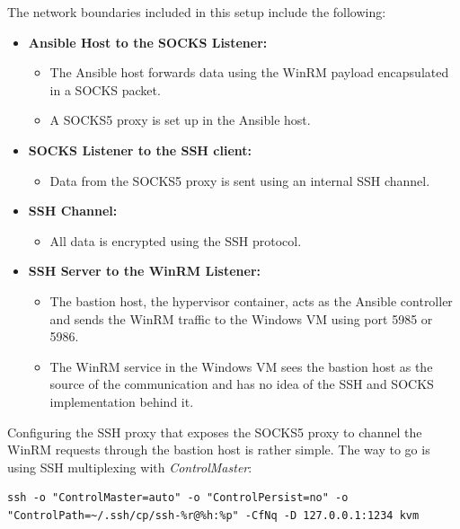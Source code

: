 The network boundaries included in this setup include the following:

\begin{itemize}
    \item \textbf{Ansible Host to the SOCKS Listener:}
        \begin{itemize}
            \item The Ansible host forwards data using the WinRM payload encapsulated in a SOCKS packet.
            \item A SOCKS5 proxy is set up in the Ansible host.
        \end{itemize}
    \item \textbf{SOCKS Listener to the SSH client:}
        \begin{itemize}
            \item Data from the SOCKS5 proxy is sent using an internal SSH channel.
        \end{itemize}
    \item \textbf{SSH Channel:}
        \begin{itemize}
            \item All data is encrypted using the SSH protocol.
        \end{itemize}
    \item \textbf{SSH Server to the WinRM Listener:}
        \begin{itemize}
            \item The bastion host, the hypervisor container, acts as the Ansible controller and sends the WinRM traffic to the Windows VM using port 5985 or 5986.
            \item The WinRM service in the Windows VM sees the bastion host as the source of the communication and has no idea of the SSH and SOCKS implementation behind it.
        \end{itemize}
\end{itemize}

Configuring the SSH proxy that exposes the SOCKS5 proxy to channel the WinRM requests through the bastion host is rather simple. The way to go is using SSH multiplexing with \textit{ControlMaster}:

\begin{lstlisting}[caption=SSH Proxy Exposing SOCKS5 Proxy.,numbers=none,label={lst:ssh_proxy_socks5}]
ssh -o "ControlMaster=auto" -o "ControlPersist=no" -o "ControlPath=~/.ssh/cp/ssh-%r@%h:%p" -CfNq -D 127.0.0.1:1234 kvm
\end{lstlisting}

